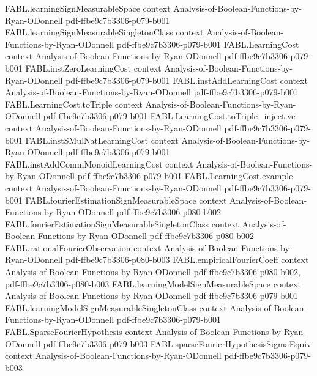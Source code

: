 \begin{theorem}
\proofstep
  {FABL.learningSignMeasurableSpace}
  {context}
  {Analysis-of-Boolean-Functions-by-Ryan-ODonnell}
  {pdf-ffbe9c7b3306-p079-b001}
\proofstep
  {FABL.learningSignMeasurableSingletonClass}
  {context}
  {Analysis-of-Boolean-Functions-by-Ryan-ODonnell}
  {pdf-ffbe9c7b3306-p079-b001}
\proofstep
  {FABL.LearningCost}
  {context}
  {Analysis-of-Boolean-Functions-by-Ryan-ODonnell}
  {pdf-ffbe9c7b3306-p079-b001}
\proofstep
  {FABL.instZeroLearningCost}
  {context}
  {Analysis-of-Boolean-Functions-by-Ryan-ODonnell}
  {pdf-ffbe9c7b3306-p079-b001}
\proofstep
  {FABL.instAddLearningCost}
  {context}
  {Analysis-of-Boolean-Functions-by-Ryan-ODonnell}
  {pdf-ffbe9c7b3306-p079-b001}
\proofstep
  {FABL.LearningCost.toTriple}
  {context}
  {Analysis-of-Boolean-Functions-by-Ryan-ODonnell}
  {pdf-ffbe9c7b3306-p079-b001}
\proofstep
  {FABL.LearningCost.toTriple_injective}
  {context}
  {Analysis-of-Boolean-Functions-by-Ryan-ODonnell}
  {pdf-ffbe9c7b3306-p079-b001}
\proofstep
  {FABL.instSMulNatLearningCost}
  {context}
  {Analysis-of-Boolean-Functions-by-Ryan-ODonnell}
  {pdf-ffbe9c7b3306-p079-b001}
\proofstep
  {FABL.instAddCommMonoidLearningCost}
  {context}
  {Analysis-of-Boolean-Functions-by-Ryan-ODonnell}
  {pdf-ffbe9c7b3306-p079-b001}
\proofstep
  {FABL.LearningCost.example}
  {context}
  {Analysis-of-Boolean-Functions-by-Ryan-ODonnell}
  {pdf-ffbe9c7b3306-p079-b001}
\proofstep
  {FABL.fourierEstimationSignMeasurableSpace}
  {context}
  {Analysis-of-Boolean-Functions-by-Ryan-ODonnell}
  {pdf-ffbe9c7b3306-p080-b002}
\proofstep
  {FABL.fourierEstimationSignMeasurableSingletonClass}
  {context}
  {Analysis-of-Boolean-Functions-by-Ryan-ODonnell}
  {pdf-ffbe9c7b3306-p080-b002}
\proofstep
  {FABL.rationalFourierObservation}
  {context}
  {Analysis-of-Boolean-Functions-by-Ryan-ODonnell}
  {pdf-ffbe9c7b3306-p080-b003}
\proofstep
  {FABL.empiricalFourierCoeff}
  {context}
  {Analysis-of-Boolean-Functions-by-Ryan-ODonnell}
  {pdf-ffbe9c7b3306-p080-b002,
    pdf-ffbe9c7b3306-p080-b003}
\proofstep
  {FABL.learningModelSignMeasurableSpace}
  {context}
  {Analysis-of-Boolean-Functions-by-Ryan-ODonnell}
  {pdf-ffbe9c7b3306-p079-b001}
\proofstep
  {FABL.learningModelSignMeasurableSingletonClass}
  {context}
  {Analysis-of-Boolean-Functions-by-Ryan-ODonnell}
  {pdf-ffbe9c7b3306-p079-b001}
\proofstep
  {FABL.SparseFourierHypothesis}
  {context}
  {Analysis-of-Boolean-Functions-by-Ryan-ODonnell}
  {pdf-ffbe9c7b3306-p079-b003}
\proofstep
  {FABL.sparseFourierHypothesisSigmaEquiv}
  {context}
  {Analysis-of-Boolean-Functions-by-Ryan-ODonnell}
  {pdf-ffbe9c7b3306-p079-b003}
\proofstep

\end{theorem}
